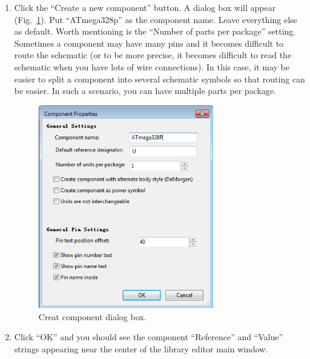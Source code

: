 \documentclass[12pt,letterpaper]{scrartcl}
\begin{document}
\begin{enumerate}
	\item Click the ``Create a new component'' button. A dialog box will appear (Fig.~\ref{fig:create-component}). Put \nohyphens{``ATmega328p''} as the component name. Leave everything else as default. Worth mentioning is the ``Number of parts per package'' setting. Sometimes a component may have many pins and it becomes difficult to route the schematic (or to be more precise, it becomes difficult to read the schematic when you have lots of wire connections). In this case, it may be easier to split a component into several schematic symbols so that routing can be easier. In such a scenario, you can have multiple parts per package. 
		\begin{figure}[hp]
			\centering
			\includegraphics[width=3in]{create-component}
			\caption{Creat component dialog box.}
			\label{fig:create-component}
		\end{figure}
		
	\item Click ``OK'' and you should see the component ``Reference'' and ``Value'' strings appearing near the center of the library editor main window. 
	

\end{enumerate}
\end{document}
